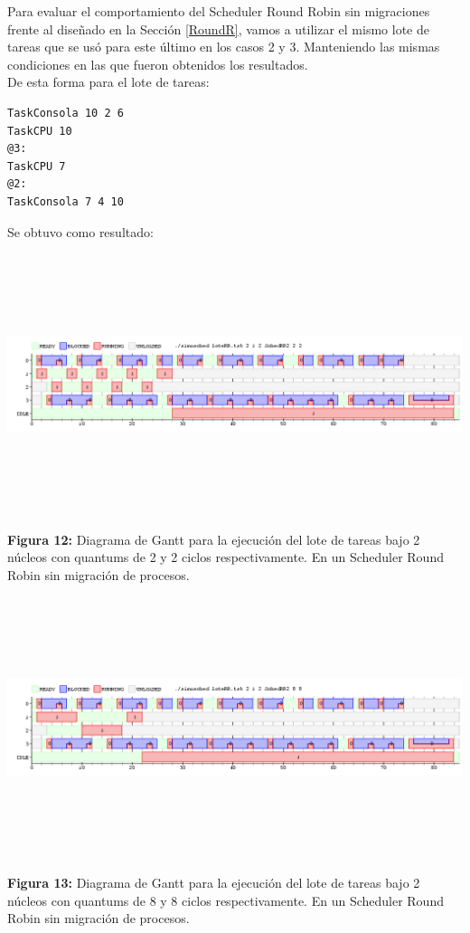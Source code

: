 \documentclass[a4paper]{article}
\begin{document}
\bigskip 
 
Para evaluar el comportamiento del Scheduler Round Robin sin migraciones frente al diseñado en la Sección \ref{RoundR}, vamos a utilizar el mismo lote de tareas que se us\'o para este último en los casos 2 y 3. Manteniendo las mismas condiciones en las que fueron obtenidos los resultados.\\


De esta forma para el lote de tareas:
 
 \begin{codesnippet}
	\begin{verbatim}
TaskConsola 10 2 6
TaskCPU 10
@3:
TaskCPU 7
@2:
TaskConsola 7 4 10
	\end{verbatim}
	\end{codesnippet}
	
Se obtuvo como resultado:	

\includegraphics[width=\textwidth,height=3.0in,keepaspectratio
]{imagenes/ej8/2eje1.png} \\
\begin {flushleft}
\textbf{Figura 12:} Diagrama de Gantt para la ejecuci\'on del lote de tareas bajo 2 n\'ucleos con quantums de 2 y 2 ciclos respectivamente. En un Scheduler Round Robin sin migración de procesos.
\end{flushleft}	
 
  
  \includegraphics[width=\textwidth,height=3.0in,keepaspectratio
]{imagenes/ej8/2eje2.png} \\
\begin {flushleft}
\textbf{Figura 13:} Diagrama de Gantt para la ejecuci\'on del lote de tareas bajo 2 n\'ucleos con quantums de 8 y 8 ciclos respectivamente. En un Scheduler Round Robin sin migración de procesos.
\end{flushleft}	
\end{document}
